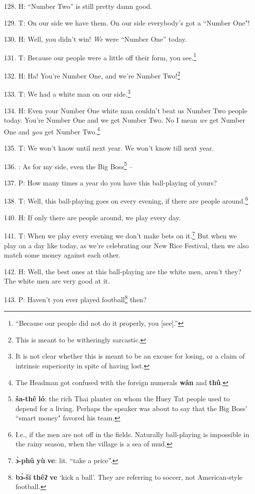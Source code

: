 128. H: ``Number Two'' is still pretty damn good.

129. T: On our side we have them. On our side everybody's got a ``Number
One"!

130. H: Well, you didn't win! \textit{We} were ``Number One'' today.

131. T: Because our people were a little off their form, you see.\footnote{``Because our people did not do it properly, you [see].''}

132. H: Ha! You're Number One, and we're Number Two!\footnote{This is meant to be witheringly sarcastic.}

133. T: We had a white man on our side.\footnote{It is not clear whether this is meant to be an excuse for losing, or a claim of intrinsic superiority in spite of having lost.}

134. H: Even your Number One white man couldn't beat us Number Two people today.
You're Number One and we get Number Two. No I mean \textit{we} get Number One and
\textit{you} get Number Two.\footnote{The Headman got confused with the foreign numerals \textbf{wân} and \textbf{thû}.}

135. T: We won't know until next year. We won't know till next year.

136. : As for my side, even the Big Boss\footnote{\textbf{ša-thê} \textbf{ló}: the rich Thai planter on whom the Huey Tat people used to depend for a living. Perhaps the speaker was about to say that the Big Boss' ``smart money" favored his team.} --

137. P: How many times a year do you have this ball-playing of yours?

138. T: Well, this ball-playing goes on every evening, if there are people around.\footnote{I.e., if the men are not off in the fields. Naturally ball-playing is impossible in the rainy season, when the village is a sea of mud.}

140. H: If only there are people around, we play every day.

141. T: When we play every evening we don't make bets on it.\footnote{\textbf{ɔ̀-phû} \textbf{yù} \textbf{ve}: lit. ``take a price''.} But when we play
on a day like today, as we're celebrating our New Rice Festival, then we also match
some money against each other.

142. H: Well, the best ones at this ball-playing are the white men, aren't they?
The white men are very good at it.

143. P: Haven't you ever played football\footnote{\textbf{bɔ́-šī} \textbf{thêʔ} \textbf{ve} `kick a ball'. They are referring to soccer, not American-style football.} then?

